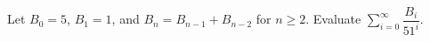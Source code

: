 Let $ B_0=5 $, $ B_1=1 $, and $ B_n=B_{n-1}+B_{n-2}$ for $ n\ge2 $. Evaluate $\sum_{i=0}^{\infty}\dfrac{B_i}{51^i}$.

